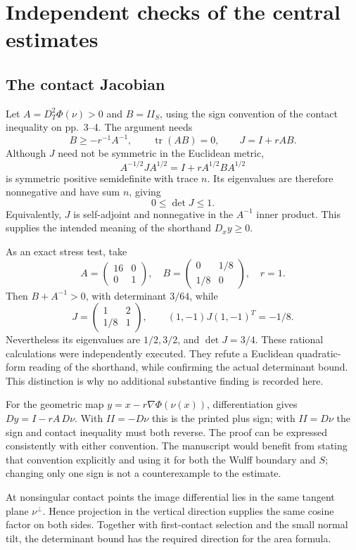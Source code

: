 \documentclass[10pt]{article}
\begin{document}
\section*{Independent checks of the central estimates}
\subsection*{The contact Jacobian}
Let \(A=D_T^2\Phi(\nu)>0\) and \(B=II_S\), using the sign convention of the contact inequality on pp. 3–4. The argument needs \[B\ge-r^{-1}A^{-1},\qquad \operatorname{tr}(AB)=0,\qquad
 J=I+rAB.\] Although \(J\) need not be symmetric in the Euclidean metric, \[A^{-1/2}JA^{1/2}=I+rA^{1/2}BA^{1/2}\] is symmetric positive semidefinite with trace \(n\). Its eigenvalues are therefore nonnegative and have sum \(n\), giving \[0\le\det J\le1.\] Equivalently, \(J\) is self-adjoint and nonnegative in the \(A^{-1}\) inner product. This supplies the intended meaning of the shorthand \(D_xy\ge0\).\par
As an exact stress test, take \[A=\begin{pmatrix}16&0\\0&1\end{pmatrix},\quad
 B=\begin{pmatrix}0&1/8\\1/8&0\end{pmatrix},\quad r=1.\] Then \(B+A^{-1}>0\), with determinant \(3/64\), while \[J=\begin{pmatrix}1&2\\1/8&1\end{pmatrix},\qquad
 (1,-1)J(1,-1)^T=-1/8.\] Nevertheless its eigenvalues are \(1/2,3/2\), and \(\det J=3/4\). These rational calculations were independently executed. They refute a Euclidean quadratic-form reading of the shorthand, while confirming the actual determinant bound. This distinction is why no additional substantive finding is recorded here.\par
For the geometric map \(y=x-r\nabla\Phi(\nu(x))\), differentiation gives \(Dy=I-rA\,D\nu\). With \(II=-D\nu\) this is the printed plus sign; with \(II=D\nu\) the sign and contact inequality must both reverse. The proof can be expressed consistently with either convention. The manuscript would benefit from stating that convention explicitly and using it for both the Wulff boundary and \(S\); changing only one sign is not a counterexample to the estimate.\par
At nonsingular contact points the image differential lies in the same tangent plane \(\nu^\perp\). Hence projection in the vertical direction supplies the same cosine factor on both sides. Together with first-contact selection and the small normal tilt, the determinant bound has the required direction for the area formula.\par
\end{document}
